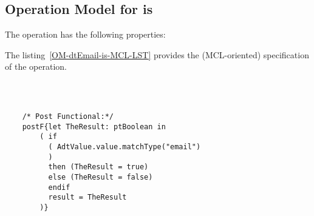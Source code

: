 \subsection{Operation Model for is}

\label{OM-is}


The  operation has the following properties:

	\begin{operationmodel}



		


	\end{operationmodel}



	\vspace{1cm}
	The listing~\ref{OM-dtEmail-is-MCL-LST} provides the \msrmessir (MCL-oriented) specification of the operation.
	
	\scriptsize
	\vspace{0.5cm}
	\begin{lstlisting}[style=MessirStyle,firstnumber=auto,captionpos=b,caption={\msrmessir (MCL-oriented) specification of the operation \emph{is}.},label=OM-dtEmail-is-MCL-LST]

	
	
	/* Post Functional:*/ 
	postF{let TheResult: ptBoolean in
	    ( if
	      ( AdtValue.value.matchType("email")
	      )
	      then (TheResult = true)
	      else (TheResult = false)
	      endif
	      result = TheResult
	    )}
	
	
	\end{lstlisting}
	\normalsize 
	
	
	
	





